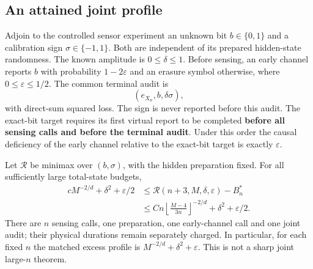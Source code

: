 \subsection{An attained joint profile}
\begin{corollary}\label{cor:jointpool}
Adjoin to the controlled sensor experiment an unknown bit $b\in\{0,1\}$ and a calibration sign $\sigma\in\{-1,1\}$. Both are independent of its prepared hidden-state randomness. The known amplitude is $0\le\delta\le1$. Before sensing, an early channel reports $b$ with probability $1-2\varepsilon$ and an erasure symbol otherwise, where $0\le\varepsilon\le1/2$. The common terminal audit is
\[
 (e_{X_n},b,\delta\sigma),
\]
with direct-sum squared loss. The sign is never reported before this audit. The exact-bit target requires its first virtual report to be completed \textbf{before all sensing calls and before the terminal audit}. Under this order the causal deficiency of the early channel relative to the exact-bit target is exactly $\varepsilon$.

Let $\mathcal R$ be minimax over $(b,\sigma)$, with the hidden preparation fixed. For all sufficiently large total-state budgets,
\begin{equation}\label{eq:jointpool}
\begin{split}
 cM^{-2/d}+\delta^2+\varepsilon/2
 &\le\mathcal R(n+3,M,\delta,\varepsilon)-B_n^*\\
 &\le Cn\left\lfloor\frac{M-4}{3n}\right\rfloor^{-2/d}
                  +\delta^2+\varepsilon/2.
\end{split}
\end{equation}
There are $n$ sensing calls, one preparation, one early-channel call and one joint audit; their physical durations remain separately charged. In particular, for each fixed $n$ the matched excess profile is $M^{-2/d}+\delta^2+\varepsilon$. This is not a sharp joint large-$n$ theorem.
\end{corollary}
